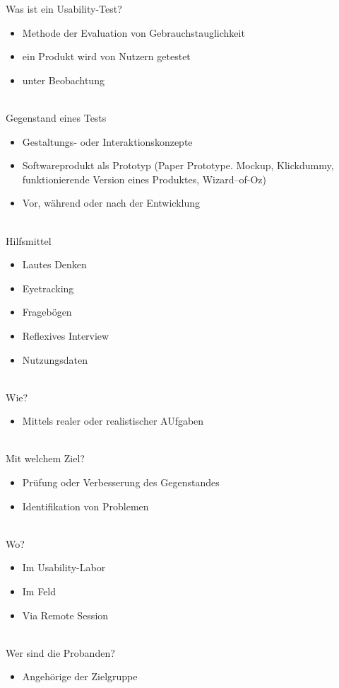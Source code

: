\documentclass[a4paper]{article}
\begin{document}
Was ist ein Usability-Test?
\begin{itemize}
	\item Methode der Evaluation von Gebrauchstauglichkeit
	\item ein Produkt wird von Nutzern getestet
	\item unter Beobachtung
\end{itemize}
~\\
Gegenstand eines Tests
\begin{itemize}
	\item Gestaltungs- oder Interaktionskonzepte
	\item Softwareprodukt als Prototyp (Paper Prototype. Mockup, Klickdummy, funktionierende Version eines Produktes, Wizard–of-Oz)
	\item Vor, während oder nach der Entwicklung
\end{itemize}
~\\
Hilfsmittel
\begin{itemize}
	\item Lautes Denken
	\item Eyetracking
	\item Fragebögen
	\item Reflexives Interview
	\item Nutzungsdaten
\end{itemize}
~\\
Wie?
\begin{itemize}
	\item Mittels realer oder realistischer AUfgaben
\end{itemize}
~\\
Mit welchem Ziel?
\begin{itemize}
	\item Prüfung oder Verbesserung des Gegenstandes
	\item Identifikation von Problemen
\end{itemize}
~\\
Wo?
\begin{itemize}
	\item Im Usability-Labor
	\item Im Feld
	\item Via Remote Session
\end{itemize}
~\\
Wer sind die Probanden?
\begin{itemize}
	\item Angehörige der Zielgruppe
\end{itemize}
~\\
\end{document}
